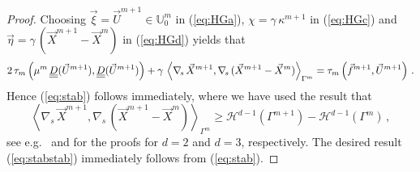 \documentclass[a4paper,12pt,onecolumn]{article}
\newcommand{\uspace}{\mathbb{U}}
\newcommand{\nabs}{\nabla_{\!s}}
\newcommand{\mat}[1]{\underline{\underline{#1}}\rule{0pt}{0pt}}
\begin{document}
\begin{proof}
Choosing $\vec\xi = \vec U^{m+1} \in \uspace^m_0$ in (\ref{eq:HGa}), $\chi = \gamma\,\kappa^{m+1}$ in (\ref{eq:HGc}) and $\vec\eta=\gamma\,({\vec{X}^{m+1}-\vec{X}^m})$ in (\ref{eq:HGd}) yields that
\begin{equation*}
2\,\tau_m\left(\mu^m\,\mat D(\vec U^{m+1}), \mat D(\vec U^{m+1}) \right) + \gamma\,\left\langle \nabs\,\vec{X}^{m+1}, \nabs\,(\vec{X}^{m+1} - \vec{X}^m) \right\rangle_{\Gamma^m}= \tau_m\left(\vec f^{m+1}, \vec U^{m+1} \right)\,.
\end{equation*}
Hence (\ref{eq:stab}) follows immediately, where we have used the result that
\begin{equation*}
\left\langle \nabs\,\vec{X}^{m+1}, \nabs\,(\vec{X}^{m+1} - \vec{X}^m) \right\rangle_{\Gamma^m} \geq \mathcal{H}^{d-1}(\Gamma^{m+1}) - \mathcal{H}^{d-1}(\Gamma^{m})\,,
\end{equation*}
see e.g.\ \cite[Proof of Theorem~2.3]{triplej} and \cite[Proof of Theorem~2.2]{gflows3d} for the proofs for $d=2$ and $d=3$, respectively. The desired result (\ref{eq:stabstab}) immediately follows from (\ref{eq:stab}).
\end{proof}
\end{document}

